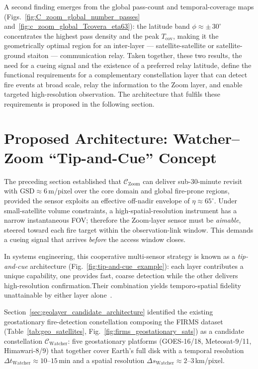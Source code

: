 A second finding emerges from the global pass-count and temporal-coverage maps (Figs.~\ref{fig:C_zoom_global_number_passes} and~\ref{fig:c_zoom_global_Tcovera_eta63}): the latitude band $\phi \approx \pm\,30^{\circ}$ concentrates the highest pass density and the peak $T_{\text{cov}}$, making it the geometrically optimal region for an inter-layer --- satellite-satellite or satellite-ground staiton ---  communication relay.  Taken together, these two results, the need for a cueing signal and the existence of a preferred relay latitude, define the functional requirements for a complementary constellation layer that can detect fire events at broad scale, relay the information to the Zoom layer, and enable targeted high-resolution observation.  The architecture that fulfils these requirements is proposed in the following section.


\section{Proposed Architecture: Watcher--Zoom ``Tip-and-Cue'' Concept}
\label{sec:proposed_architecture}

The preceding section established that $\mathcal{C}_{\text{Zoom}}$ can deliver sub-30-minute revisit with $\text{GSD} \approx 6$\,m/pixel over the core domain and global fire-prone regions, provided the sensor exploits an effective off-nadir envelope of $\eta \approx 65^{\circ}$.  Under small-satellite volume constraints, a high-spatial-resolution instrument has a narrow instantaneous FOV; therefore the Zoom-layer sensor must be \emph{aimable}, steered toward each fire target within the observation-link window.  This demands a cueing signal that arrives \emph{before} the access window closes.

In systems engineering, this cooperative multi-sensor strategy is known as a \emph{tip-and-cue} architecture (Fig.~\ref{fig:tip-and-cue_example}): each layer contributes a unique capability, one provides fast, coarse detection while the other delivers high-resolution confirmation.Their combination yields temporo-spatial fidelity unattainable by either layer alone~\cite{_architecture_tipcue}. 

Section~\ref{sec:geolayer_candidate_architecture} identified the existing geostationary fire-detection constellation composing the FIRMS dataset (Table~\ref{tab:geo_satellites}, Fig.~\ref{fig:firms_geostationary_sats}) as a candidate constellation $\mathcal{C}_{\text{Watcher}}$: five geostationary platforms (GOES-16/18, Meteosat-9/11, Himawari-8/9) that together cover Earth's full disk with a temporal resolution $\Delta t_{\text{Watcher}} \approx 10$--$15$\,min and a spatial resolution $\Delta s_{\text{Watcher}} \approx 2$--$3$\,km/pixel.

